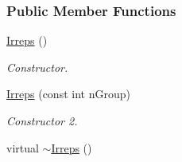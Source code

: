\subsubsection*{Public Member Functions}
\begin{DoxyCompactItemize}
\item 
\hypertarget{classCheMPS2_1_1Irreps_ab84ea352fb5deb5030a9d75809acad40}{\hyperlink{classCheMPS2_1_1Irreps_ab84ea352fb5deb5030a9d75809acad40}{Irreps} ()}\label{classCheMPS2_1_1Irreps_ab84ea352fb5deb5030a9d75809acad40}

\begin{DoxyCompactList}\small\item\em Constructor. \end{DoxyCompactList}\item 
\hyperlink{classCheMPS2_1_1Irreps_a8d33ef5ebd5cf824cf62f3383b455a07}{Irreps} (const int n\-Group)
\begin{DoxyCompactList}\small\item\em Constructor 2. \end{DoxyCompactList}\item 
\hypertarget{classCheMPS2_1_1Irreps_a1bd119362f8477f5d2babe1404ca0826}{virtual \hyperlink{classCheMPS2_1_1Irreps_a1bd119362f8477f5d2babe1404ca0826}{$\sim$\-Irreps} ()}\label{classCheMPS2_1_1Irreps_a1bd119362f8477f5d2babe1404ca0826}


\end{DoxyCompactItemize}
